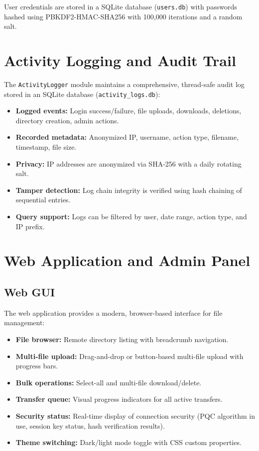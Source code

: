 User credentials are stored in a SQLite database (\texttt{users.db}) with passwords hashed using PBKDF2-HMAC-SHA256 with 100,000 iterations and a random salt.

\section{Activity Logging and Audit Trail}

The \texttt{ActivityLogger} module maintains a comprehensive, thread-safe audit log stored in an SQLite database (\texttt{activity\_logs.db}):

\begin{itemize}
    \item \textbf{Logged events:} Login success/failure, file uploads, downloads, deletions, directory creation, admin actions.
    \item \textbf{Recorded metadata:} Anonymized IP, username, action type, filename, timestamp, file size.
    \item \textbf{Privacy:} IP addresses are anonymized via SHA-256 with a daily rotating salt.
    \item \textbf{Tamper detection:} Log chain integrity is verified using hash chaining of sequential entries.
    \item \textbf{Query support:} Logs can be filtered by user, date range, action type, and IP prefix.
\end{itemize}

\section{Web Application and Admin Panel}

\subsection{Web GUI}

The web application provides a modern, browser-based interface for file management:

\begin{itemize}
    \item \textbf{File browser:} Remote directory listing with breadcrumb navigation.
    \item \textbf{Multi-file upload:} Drag-and-drop or button-based multi-file upload with progress bars.
    \item \textbf{Bulk operations:} Select-all and multi-file download/delete.
    \item \textbf{Transfer queue:} Visual progress indicators for all active transfers.
    \item \textbf{Security status:} Real-time display of connection security (PQC algorithm in use, session key status, hash verification results).
    \item \textbf{Theme switching:} Dark/light mode toggle with CSS custom properties.
\end{itemize}

